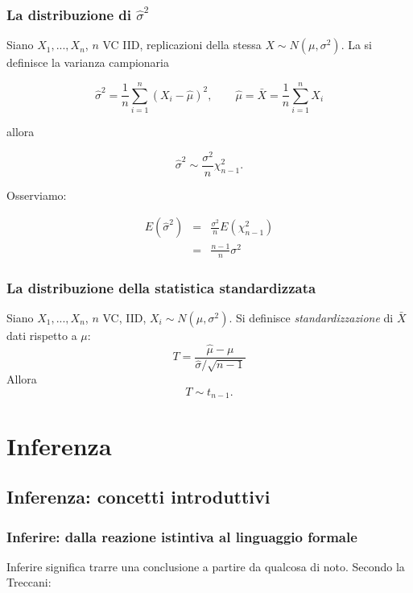 \documentclass[
  11pt,
]{book}
\theoremstyle{mytheoremstyle}
\theoremstyle{mydefstyle}
\begin{document}
\section{\texorpdfstring{La distribuzione di \(\hat\sigma^2\)}{La distribuzione di \textbackslash hat\textbackslash sigma\^{}2}}\label{la-distribuzione-di-hatsigma2}

Siano \(X_1,...,X_n\), \(n\) VC IID, replicazioni della stessa \(X\sim N(\mu,\sigma^2)\).
La si definisce la varianza campionaria

\[\hat\sigma^2=\frac 1 n \sum_{i=1}^n(X_i-\hat \mu)^2, \qquad \hat \mu=\bar X=\frac 1 n \sum_{i=1}^nX_i\]

allora

\[ \hat\sigma^2\sim\frac{\sigma^2}n\chi^2_{n-1}.\]

Osserviamo:

\begin{eqnarray*}
E(\hat\sigma^2) &=& \frac {\sigma^2}n E(\chi^2_{n-1})\\
                &=& \frac{n-1}n \sigma^2
\end{eqnarray*}

\section{La distribuzione della statistica standardizzata}\label{la-distribuzione-della-statistica-standardizzata}

Siano \(X_1,...,X_n\), \(n\) VC, IID, \(X_i\sim N(\mu,\sigma^2)\). Si definisce \emph{standardizzazione} di \(\bar X\) dati rispetto a \(\mu\):
\[T=\frac{\hat \mu-\mu}{{\hat\sigma}/{\sqrt{n-1}}}\]
Allora
\[T\sim t_{n-1}. \]

\part{Inferenza}

\chapter{Inferenza: concetti introduttivi}\label{inferenza-concetti-introduttivi}

\section{Inferire: dalla reazione istintiva al linguaggio formale}\label{inferire-dalla-reazione-istintiva-al-linguaggio-formale}

Inferire significa trarre una conclusione a partire da qualcosa di noto. Secondo la Treccani:
\end{document}
